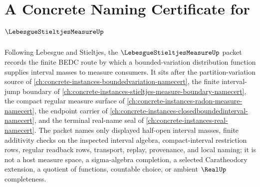 \chapter{A Concrete Naming Certificate for $\LebesgueStieltjesMeasureUp$}
\label{ch:concrete-instances-lebesgue-stieltjes-measure-namecert}

Following Lebesgue and Stieltjes, the $\LebesgueStieltjesMeasureUp$ packet records the finite BEDC route by which a bounded-variation distribution function supplies interval masses to measure consumers. It sits after the partition-variation source of \autoref{ch:concrete-instances-boundedvariation-namecert}, the finite interval-jump boundary of \autoref{ch:concrete-instances-stieltjes-measure-boundary-namecert}, the compact regular measure surface of \autoref{ch:concrete-instances-radon-measure-namecert}, the endpoint carrier of \autoref{ch:concrete-instances-closedboundedinterval-namecert}, and the terminal real-name seal of \autoref{ch:concrete-instances-real-namecert}. The packet names only displayed half-open interval masses, finite additivity checks on the inspected interval algebra, compact-interval restriction rows, regular readback rows, transport, replay, provenance, and local naming; it is not a host measure space, a sigma-algebra completion, a selected Caratheodory extension, a quotient of functions, countable choice, or ambient $\RealUp$ completeness.

